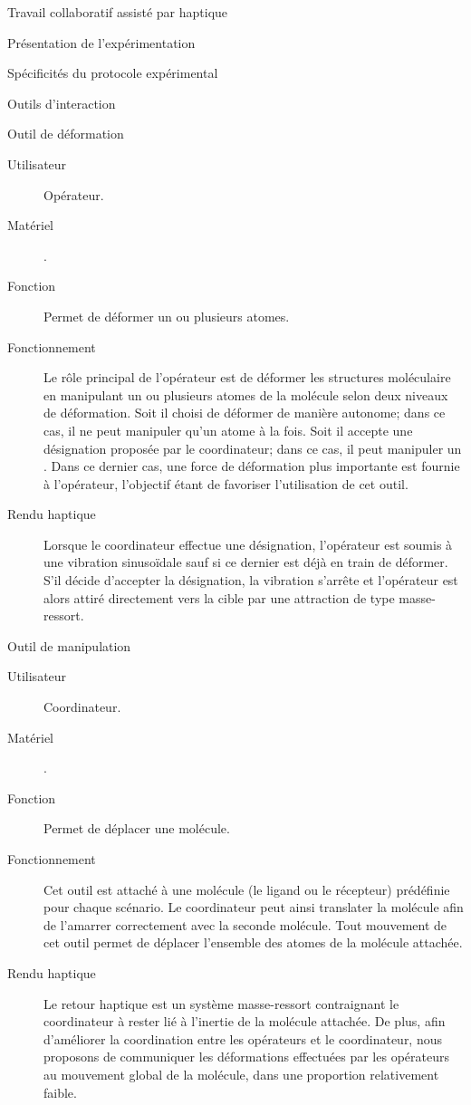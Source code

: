 \documentclass[myfrancais,ngerman,english,french]{mythesis}
\begin{document}
\begin{mychapter}{Travail collaboratif assisté par haptique}
\begin{mysection}{Présentation de l'expérimentation}
\begin{mysubsection}{Spécificités du protocole expérimental}
\begin{mysubsubsection}{Outils d'interaction}
\begin{myparagraph}{Outil de déformation}
						\begin{description}
							\item[Utilisateur] Opérateur.
							\item[Matériel] \myOmni.
							\item[Fonction] Permet de déformer un ou plusieurs atomes.
							\item[Fonctionnement]
								Le rôle principal de l'opérateur est de déformer les structures moléculaire en manipulant un ou plusieurs atomes de la molécule selon deux niveaux de déformation.
								Soit il choisi de déformer de manière autonome; dans ce cas, il ne peut manipuler qu'un atome à la fois.
								Soit il accepte une désignation proposée par le coordinateur; dans ce cas, il peut manipuler un .
								Dans ce dernier cas, une force de déformation plus importante est fournie à l'opérateur, l'objectif étant de favoriser l'utilisation de cet outil.
							\item[Rendu haptique]
								Lorsque le coordinateur effectue une désignation, l'opérateur est soumis à une vibration sinusoïdale sauf si ce dernier est déjà en train de déformer.
								S'il décide d'accepter la désignation, la vibration s'arrête et l'opérateur est alors attiré directement vers la cible par une attraction de type masse-ressort.
						\end{description}
					\end{myparagraph}
					\begin{myparagraph}{Outil de manipulation}
						\begin{description}
							\item[Utilisateur] Coordinateur.
							\item[Matériel] \myDesktop.
							\item[Fonction] Permet de déplacer une molécule.
							\item[Fonctionnement]
								Cet outil est attaché à une molécule (le ligand ou le récepteur) prédéfinie pour chaque scénario.
								Le coordinateur peut ainsi translater la molécule afin de l'amarrer correctement avec la seconde molécule.
								Tout mouvement de cet outil permet de déplacer l'ensemble des atomes de la molécule attachée.
							\item[Rendu haptique]
								Le retour haptique est un système masse-ressort contraignant le coordinateur à rester lié à l'inertie de la molécule attachée.
								De plus, afin d'améliorer la coordination entre les opérateurs et le coordinateur, nous proposons de communiquer les déformations effectuées par les opérateurs au mouvement global de la molécule, dans une proportion relativement faible.

\end{description}
\end{myparagraph}
\end{mysubsubsection}
\end{mysubsection}
\end{mysection}
\end{mychapter}
\end{document}

